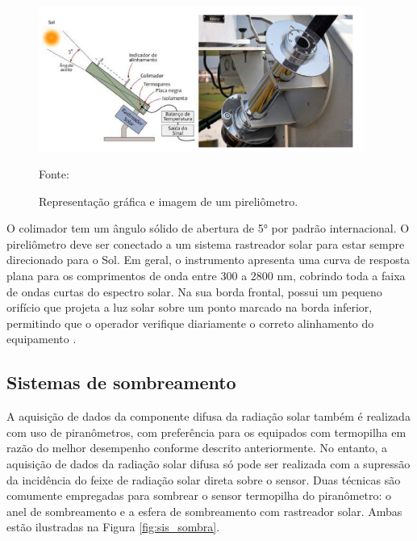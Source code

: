 \begin{figure}[H]
    \centering
    \includegraphics[width=0.95\textwidth]{./Figuras/pirheliometro.png}
    \caption{Representação gráfica e imagem de um pireliômetro.}{Fonte: \cite{kippzonen}}
   \label{fig:pirheliometro}
\end{figure}

O colimador tem um ângulo sólido de abertura de 5° por padrão internacional. O pireliômetro deve ser conectado a um sistema rastreador solar para estar sempre direcionado para o Sol. Em geral, o instrumento apresenta uma curva de resposta plana para os comprimentos de onda entre 300 a 2800 nm, cobrindo toda a faixa de ondas curtas do espectro solar. Na sua borda frontal, possui um pequeno orifício que projeta a luz solar sobre um ponto marcado na borda inferior, permitindo que o operador verifique diariamente o correto alinhamento do equipamento \cite{atlas2017}.

\subsection{Sistemas de sombreamento}

A aquisição de dados da componente difusa da radiação solar também é realizada com uso de piranômetros, com preferência para os equipados com termopilha em razão do melhor desempenho conforme descrito anteriormente. No entanto, a aquisição de dados da radiação solar difusa só pode ser realizada com a supressão da incidência do feixe de radiação solar direta sobre o sensor. Duas técnicas são comumente empregadas para sombrear o sensor termopilha do piranômetro: o anel de sombreamento e a esfera de sombreamento com rastreador solar. Ambas estão ilustradas na Figura \ref{fig:sis_sombra}.

